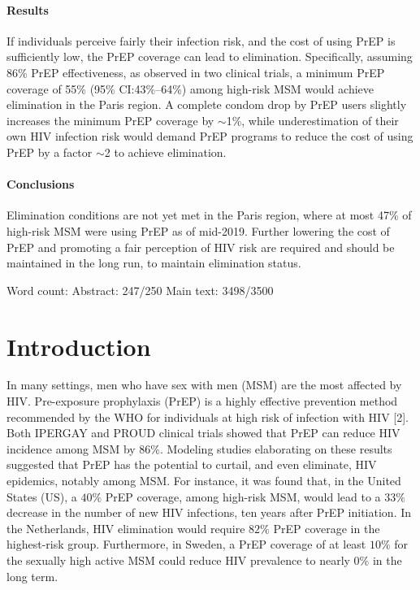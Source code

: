 \documentclass[preprint,review,12pt]{article}			%
\begin{document}
\paragraph{Results}
If individuals perceive fairly their infection risk, and the cost of using PrEP is sufficiently low, the PrEP coverage can lead to elimination. Specifically, assuming 86\% PrEP effectiveness, as observed in two clinical trials, a minimum PrEP coverage of 55\% (95\% CI:43\%--64\%) among high-risk MSM would achieve elimination in the Paris region. A complete condom drop by PrEP users slightly increases the minimum PrEP coverage by $\sim$1\%, while underestimation of their own HIV infection risk would demand PrEP programs to reduce the cost of using PrEP by a factor $\sim$2 to achieve elimination. 
 
\paragraph{Conclusions}
Elimination conditions are not yet met in the Paris region, where at most 47\% of high-risk MSM were using PrEP as of mid-2019. Further lowering the cost of PrEP and promoting a fair perception of HIV risk are required and should be maintained in the long run, to maintain elimination status.

%

Word count:
Abstract: 247/250
Main text: 3498/3500
 


\linenumbers
\modulolinenumbers[5]



\section{Introduction} \label{sec:Intro}

In many settings, men who have sex with men (MSM) are the most affected by HIV.\cite{Beyrer2016} Pre-exposure prophylaxis (PrEP) is a highly effective prevention method recommended by the WHO for individuals at high risk of infection with HIV [2]. Both IPERGAY and PROUD clinical trials showed that PrEP can reduce HIV incidence among MSM by $86\%$.\cite{Molina2015,McCormack2016} Modeling studies elaborating on these results suggested that PrEP has the potential to curtail, and even eliminate, HIV epidemics, notably among MSM.\cite{Jenness2016,Rozhnova2018,Hansson2020,Scott2018} For instance, it was found that, in the United States (US), a $40\%$ PrEP coverage, among high-risk MSM, would lead to a $33\%$ decrease in the number of new HIV infections, ten years after PrEP initiation.\cite{Jenness2016} In the Netherlands, HIV elimination would require $82\%$ PrEP coverage in the highest-risk group.\cite{Rozhnova2018} Furthermore, in Sweden, a PrEP coverage of at least $10\%$ for the sexually high active MSM could reduce HIV prevalence to nearly $0\%$ in the long term.\cite{Hansson2020}
\end{document}
